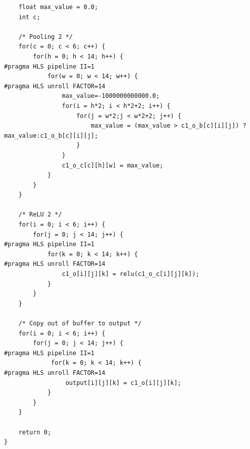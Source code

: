 \documentclass[10pt]{article}
\begin{document}
\begin{verbatim}
    float max_value = 0.0;
    int c;

    /* Pooling 2 */
    for(c = 0; c < 6; c++) {
		for(h = 0; h < 14; h++) {
#pragma HLS pipeline II=1
			for(w = 0; w < 14; w++) {
#pragma HLS unroll FACTOR=14
				max_value=-1000000000000.0;
				for(i = h*2; i < h*2+2; i++) {
					for(j = w*2;j < w*2+2; j++) {
						max_value = (max_value > c1_o_b[c][i][j]) ? max_value:c1_o_b[c][i][j];
					}
				}
				c1_o_c[c][h][w] = max_value;
			}
		}
    }

    /* ReLU 2 */
    for(i = 0; i < 6; i++) {
		for(j = 0; j < 14; j++) {
#pragma HLS pipeline II=1
			for(k = 0; k < 14; k++) {
#pragma HLS unroll FACTOR=14
				c1_o[i][j][k] = relu(c1_o_c[i][j][k]);
			}
		}
    }

    /* Copy out of buffer to output */
    for(i = 0; i < 6; i++) {
	    for(j = 0; j < 14; j++) {
#pragma HLS pipeline II=1
             for(k = 0; k < 14; k++) {
#pragma HLS unroll FACTOR=14
                 output[i][j][k] = c1_o[i][j][k];
            }
        }
    }

    return 0;
}
\end{verbatim}
\end{document}
